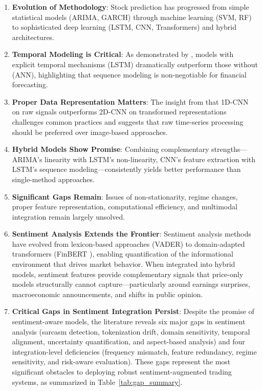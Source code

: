 \begin{enumerate}
    \item \textbf{Evolution of Methodology}: Stock prediction has progressed from simple statistical models (ARIMA, GARCH) through machine learning (SVM, RF) to sophisticated deep learning (LSTM, CNN, Transformers) and hybrid architectures.
    
    \item \textbf{Temporal Modeling is Critical}: As demonstrated by \cite{machinefailure2024}, models with explicit temporal mechanisms (LSTM) dramatically outperform those without (ANN), highlighting that sequence modeling is non-negotiable for financial forecasting.
    
    \item \textbf{Proper Data Representation Matters}: The insight from \cite{eda2023} that 1D-CNN on raw signals outperforms 2D-CNN on transformed representations challenges common practices and suggests that raw time-series processing should be preferred over image-based approaches.
    
    \item \textbf{Hybrid Models Show Promise}: Combining complementary strengths---ARIMA's linearity with LSTM's non-linearity, CNN's feature extraction with LSTM's sequence modeling---consistently yields better performance than single-method approaches.
    
    \item \textbf{Significant Gaps Remain}: Issues of non-stationarity, regime changes, proper feature representation, computational efficiency, and multimodal integration remain largely unsolved.

    \item \textbf{Sentiment Analysis Extends the Frontier}: Sentiment analysis methods have evolved from lexicon-based approaches (VADER) to domain-adapted transformers (FinBERT \cite{araci2019}), enabling quantification of the informational environment that drives market behavior. When integrated into hybrid models, sentiment features provide complementary signals that price-only models structurally cannot capture---particularly around earnings surprises, macroeconomic announcements, and shifts in public opinion.

    \item \textbf{Critical Gaps in Sentiment Integration Persist}: Despite the promise of sentiment-aware models, the literature reveals six major gaps in sentiment analysis (sarcasm detection, tokenization drift, domain sensitivity, temporal alignment, uncertainty quantification, and aspect-based analysis) and four integration-level deficiencies (frequency mismatch, feature redundancy, regime sensitivity, and risk-aware evaluation). These gaps represent the most significant obstacles to deploying robust sentiment-augmented trading systems, as summarized in Table~\ref{tab:gap_summary}.
\end{enumerate}

